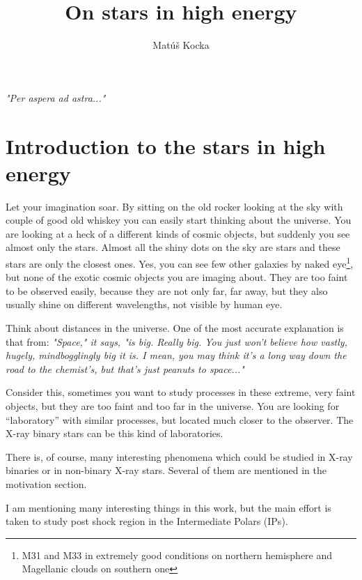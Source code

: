 \documentclass[oneside,a4paper,11pt]{report}
\title{On stars in high energy }
\author{Matúš Kocka}
\begin{document}

\newpage
\textit{"Per aspera ad astra..."}

\pagebreak
\tableofcontents

\chapter{Introduction to the stars in high energy }

Let your imagination soar. 
By sitting on the old rocker looking at the sky with couple of good old whiskey you can easily 
start thinking about the universe. You are looking at a heck of a different kinds of cosmic 
objects, but suddenly you see almost only the stars. Almost all the shiny dots on the sky are 
stars and these stars are only the closest ones. Yes, you can see few other 
galaxies by naked eye\footnote{M31 and M33 in extremely good conditions on northern hemisphere
and Magellanic clouds on southern one}, but none of the exotic cosmic objects you are imaging about. 
They are too faint to be observed easily, because they are not only far, far away, but they also usually shine 
on different wavelengths, not visible by human eye.

Think about distances in the universe. One of the most accurate explanation is that from: \cite{hitch:1}  
\textit{"Space," it says, "is big. Really big. You just won't believe how vastly, 
hugely, mindbogglingly big it is. I mean, you may think it's a long way down the road to the 
chemist's, but that's just peanuts to space..."} 

Consider this, sometimes you want to study processes in these extreme, very faint objects, 
but they are too faint and too far in the universe. You are looking for “laboratory” with similar
 processes, but located much closer to the observer. The X-ray binary stars can be this kind 
of laboratories.  

There is, of course, many interesting phenomena which could be studied in X-ray binaries or in non-binary X-ray stars. 
Several of them are mentioned in the motivation section. 

I am mentioning many interesting things in this work, but the main effort is taken to 
study post shock region in the Intermediate Polars (IPs).   
\end{document}

